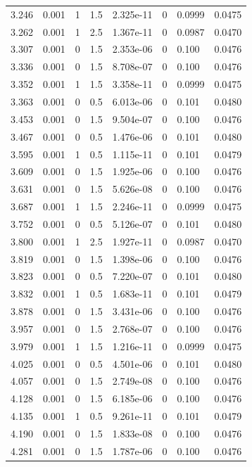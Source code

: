 \documentclass[preview]{standalone}
\begin{document}
{{{\begin{tabular}{L{1.2cm}C{1.2cm} C{0.3cm}C{0.5cm} C{1.4cm}C{1.4cm} C{1.4cm}C{1.4cm}}
  3.246  &  0.001  & 1     & 1.5 &  2.325e-11  & 0  & 0.0999 &  0.0475   \\ 
  3.262  &  0.001  & 1     & 2.5 &  1.367e-11  & 0  & 0.0987 &  0.0470   \\ 
  3.307  &  0.001  & 0     & 1.5 &  2.353e-06  & 0  & 0.100 &  0.0476   \\ 
  3.336  &  0.001  & 0     & 1.5 &  8.708e-07  & 0  & 0.100 &  0.0476   \\ 
  3.352  &  0.001  & 1     & 1.5 &  3.358e-11  & 0  & 0.0999 &  0.0475   \\ 
  3.363  &  0.001  & 0     & 0.5 &  6.013e-06  & 0  & 0.101 &  0.0480   \\ 
  3.453  &  0.001  & 0     & 1.5 &  9.504e-07  & 0  & 0.100 &  0.0476   \\ 
  3.467  &  0.001  & 0     & 0.5 &  1.476e-06  & 0  & 0.101 &  0.0480   \\ 
  3.595  &  0.001  & 1     & 0.5 &  1.115e-11  & 0  & 0.101 &  0.0479   \\ 
  3.609  &  0.001  & 0     & 1.5 &  1.925e-06  & 0  & 0.100 &  0.0476   \\ 
  3.631  &  0.001  & 0     & 1.5 &  5.626e-08  & 0  & 0.100 &  0.0476   \\ 
  3.687  &  0.001  & 1     & 1.5 &  2.246e-11  & 0  & 0.0999 &  0.0475   \\ 
  3.752  &  0.001  & 0     & 0.5 &  5.126e-07  & 0  & 0.101 &  0.0480   \\ 
  3.800  &  0.001  & 1     & 2.5 &  1.927e-11  & 0  & 0.0987 &  0.0470   \\ 
  3.819  &  0.001  & 0     & 1.5 &  1.398e-06  & 0  & 0.100 &  0.0476   \\ 
  3.823  &  0.001  & 0     & 0.5 &  7.220e-07  & 0  & 0.101 &  0.0480   \\ 
  3.832  &  0.001  & 1     & 0.5 &  1.683e-11  & 0  & 0.101 &  0.0479   \\ 
  3.878  &  0.001  & 0     & 1.5 &  3.431e-06  & 0  & 0.100 &  0.0476   \\ 
  3.957  &  0.001  & 0     & 1.5 &  2.768e-07  & 0  & 0.100 &  0.0476   \\ 
  3.979  &  0.001  & 1     & 1.5 &  1.216e-11  & 0  & 0.0999 &  0.0475   \\ 
  4.025  &  0.001  & 0     & 0.5 &  4.501e-06  & 0  & 0.101 &  0.0480   \\ 
  4.057  &  0.001  & 0     & 1.5 &  2.749e-08  & 0  & 0.100 &  0.0476   \\ 
  4.128  &  0.001  & 0     & 1.5 &  6.185e-06  & 0  & 0.100 &  0.0476   \\ 
  4.135  &  0.001  & 1     & 0.5 &  9.261e-11  & 0  & 0.101 &  0.0479   \\ 
  4.190  &  0.001  & 0     & 1.5 &  1.833e-08  & 0  & 0.100 &  0.0476   \\ 
  4.281  &  0.001  & 0     & 1.5 &  1.787e-06  & 0  & 0.100 &  0.0476   \\ 
\hline 
\end{tabular} 

}}}
\end{document}
